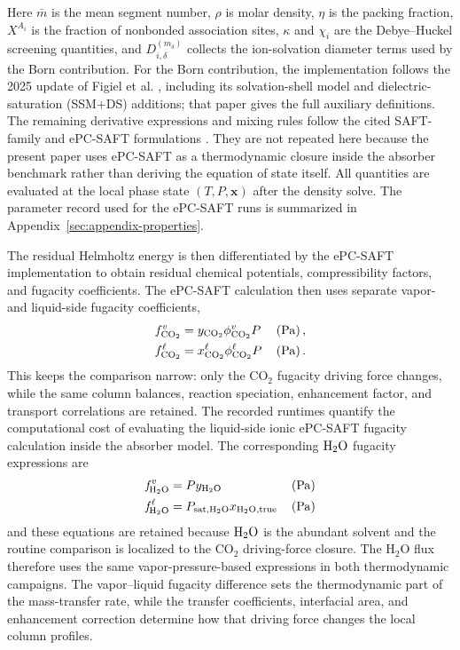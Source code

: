                 Here $\bar{m}$ is the mean segment number, $\rho$ is molar density, $\eta$ is the packing fraction, $X^{A_i}$ is the fraction of nonbonded association sites, $\kappa$ and $\chi_i$ are the Debye--Huckel screening quantities, and $D_{i,\delta}^{(m_\delta)}$ collects the ion-solvation diameter terms used by the Born contribution. For the Born contribution, the implementation follows the 2025 update of Figiel et al. \cite{Figiel2025}, including its solvation-shell model and dielectric-saturation (SSM+DS) additions; that paper gives the full auxiliary definitions. The remaining derivative expressions and mixing rules follow the cited SAFT-family and ePC-SAFT formulations \cite{Gross2001,Cameretti2005,Bulow2019,Bulow2020,Bulow2021a}. They are not repeated here because the present paper uses ePC-SAFT as a thermodynamic closure inside the absorber benchmark rather than deriving the equation of state itself. All quantities are evaluated at the local phase state $(T,P,\mathbf{x})$ after the density solve. The parameter record used for the ePC-SAFT runs is summarized in Appendix~\ref{sec:appendix-properties}.

                The residual Helmholtz energy is then differentiated by the ePC-SAFT implementation to obtain residual chemical potentials, compressibility factors, and fugacity coefficients.
                The ePC-SAFT calculation then uses separate vapor- and liquid-side fugacity coefficients,
                \begin{align}
                    f_{\COtwo}^{\vap} &= y_{\COtwo}\phi_{\COtwo}^{\vap}P
                    && \left(\unit{Pa}\right),\\
                    f_{\COtwo}^{\liq} &= x_{\COtwo}^{\liq}\phi_{\COtwo}^{\liq}P
                    && \left(\unit{Pa}\right).
                \end{align}
                This keeps the comparison narrow: only the CO$_2$ fugacity driving force changes, while the same column balances, reaction speciation, enhancement factor, and transport correlations are retained. The recorded runtimes quantify the computational cost of evaluating the liquid-side ionic ePC-SAFT fugacity calculation inside the absorber model.
                The corresponding $\HtwoO$ fugacity expressions are
                \begin{align}
                    \textit{f}^{\:\vap}_{ \HtwoO} &= P y_{\HtwoO} && \left(\unit{Pa} \right)\\
                    \textit{f}^{\:\liq}_{ \HtwoO} &= P_{\text{sat}, \HtwoO} x_{\HtwoO, \text{true}} && \left(\unit{Pa} \right)
                \end{align}
                and these equations are retained because $\HtwoO$ is the abundant solvent and the routine comparison is localized to the CO$_2$ driving-force closure. The H$_2$O flux therefore uses the same vapor-pressure-based expressions in both thermodynamic campaigns. The vapor--liquid fugacity difference sets the thermodynamic part of the mass-transfer rate, while the transfer coefficients, interfacial area, and enhancement correction determine how that driving force changes the local column profiles.

